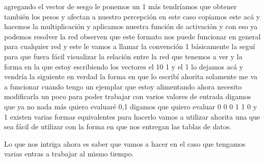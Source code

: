 agregando el vector de sesgo le ponemos un 1 más tendríamos que obtener también los pesos y afectan a nuestro percepción en este caso copiamos este acá y hacemos la multiplicación y aplicamos nuestra función de activación y con eso ya podemos resolver la red observen que este formato nos puede funcionar en general para cualquier red y este le vamos a llamar la convención 1 básicamente la seguí para que fuera fácil visualizar la relación entre la red que tenemos a ver y la forma en la que estoy escribiendo los vectores el 10 1 y el 1 lo dejamos acá y vendría la siguiente en verdad la forma en que lo escribí ahorita solamente me va a funcionar cuando tengo un ejemplar que estoy alimentando ahora necesito modificarla un poco para poder trabajar con varios valores de entrada digamos que ya no nada más quiero evaluaré 0,1 digamos que quiero evaluar 0 0 0 1 1 0 y 1 existen varias formas equivalentes para hacerlo vamos a utilizar ahorita una que sea fácil de utilizar con la forma en que nos entregan las tablas de datos.
 
 Lo que nos intriga ahora es saber que vamos a hacer en el caso que tengamos varias entras a trabajar al mismo tiempo.
 
